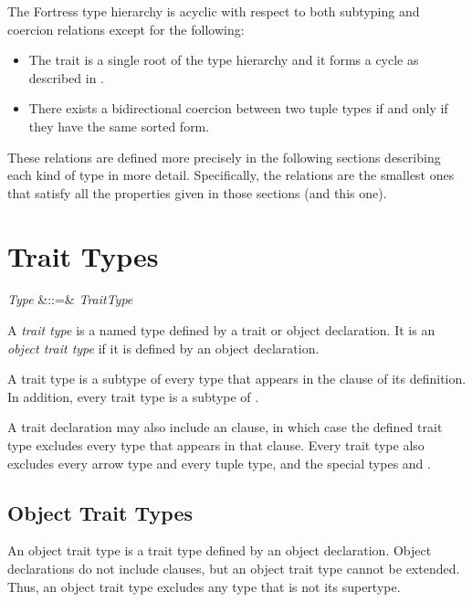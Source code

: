 The Fortress type hierarchy is acyclic with respect to both subtyping and
coercion relations except for the following:
\begin{itemize}
\item The trait  is a single root of the type hierarchy and it
forms a cycle as described in .
\item There exists a bidirectional coercion between two tuple types if and
  only if they have the same sorted form.
\end{itemize}

These relations are defined more precisely
in the following sections describing each kind of type in more detail.
Specifically,
the relations are the smallest ones that satisfy
all the properties given in those sections (and this one).


\section{Trait Types}

\begin{Grammar}
\emph{Type} &::=& \emph{TraitType} \\
\end{Grammar}

A \emph{trait type} is a named type defined by a trait or object declaration.
It is an \emph{object trait type}
if it is defined by an object declaration.

A trait type is a subtype of every type
that appears in the  clause of its definition.
In addition, every trait type is a subtype of .

A trait declaration may also include an  clause,
in which case the defined trait type
excludes every type that appears in that clause.
Every trait type also excludes every arrow type and every tuple type,
and the special types \TYP{()} and .

\subsection{Object Trait Types}

An object trait type is a trait type defined by an object declaration.
Object declarations do not include  clauses,
but an object trait type cannot be extended.
Thus, an object trait type excludes any type that is not its supertype.

